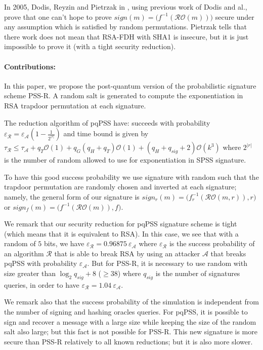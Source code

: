 \documentclass[a4paper,11pt]{article}
\begin{document}
In 2005, Dodis, Reyzin and Pietrzak in \cite{Dodis2},  using previous work of Dodis and al., prove that one can't hope to prove  $sign(m)=\big(f^{-1}(\mathcal{RO}(m))\big)$ secure under any assumption which is satisfied by random permutations. Pietrzak tells that there work does not mean that  RSA-FDH with SHA1  is insecure,  but it is just impossible to prove it (with a tight security reduction).\\

\paragraph{Contributions:}
In this paper, we propose the post-quantum version of the probabilistic signature scheme PSS-R.  A random salt is generated to compute the exponentiation in RSA trapdoor permutation at each signature.


The reduction algorithm of pqPSS have: succeeds with probability $\varepsilon_{\mathcal{R}} =\varepsilon_{\mathcal{A}}(1-\frac{1}{2^{|r|}})$ and time bound is given by $\tau_{\mathcal{R}}\leq \tau_{\mathcal{A}} + q_{T}\mathcal{O}(1) + q_{G}(q_{H}+q_{T})\mathcal{O}(1)+ (q_{H}+q_{sig}+2)\mathcal{O}(k^{3})$ where $2^{|r|}$ is the number of random allowed to use for exponentiation in SPSS signature.


To have this good success probability we use signature with random such that the trapdoor permutation are randomly chosen and inverted at each signature; namely, the general form of our signature is  $sign_{r}(m)=\big(f_{r}^{-1}(\mathcal{RO}(m, r)), r\big)$ or $sign_{f}(m)=\big(f^{-1}(\mathcal{RO}(m)), f\big)$.


We remark that our  security reduction for pqPSS signature scheme is tight (which means that it is equivalent  to RSA). In this case, we see that with a random of $5$ bits, we have $\varepsilon_{\mathcal{R}}=0.96875 \ \varepsilon_{\mathcal{A}}$ where $\varepsilon_{\mathcal{R}}$  is the success probability of an algorithm $\mathcal{R}$ that is able to break RSA by using an attacker $\mathcal{A}$ that breaks pqPSS with probability $\varepsilon_{\mathcal{A}}$. But for PSS-R, it is necessary to use  random with size greater than $\log_{2}q_{sig}+8$ ($\geq 38$) where $q_{sig}$ is the number of signatures queries, in order to have $\varepsilon_{\mathcal{R}}=1.04 \ \varepsilon_{\mathcal{A}}$.

We remark also that the success  probability of the simulation is independent from the number of signing and hashing oracles queries. For pqPSS, it is possible to sign and recover a message with a large size while keeping the size of the random salt also large; but this fact is not possible for PSS-R. This new signature is more secure than PSS-R relatively to all known reductions; but it is also more slower.
\end{document}

